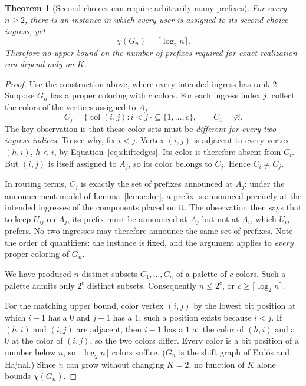 \documentclass[10pt,a4paper]{article}
\newtheorem{theorem}{Theorem}
\newcommand{\col}{\operatorname{col}}
\begin{document}
\begin{theorem}[Second choices can require arbitrarily many prefixes]\label{thm:shift}
For every $n\ge2$, there is an instance in which every user is assigned to its second-choice ingress, yet
\[
\chi(G_n)=\lceil\log_2 n\rceil.
\]
Therefore no upper bound on the number of prefixes required for exact realization can depend only on $K$.
\end{theorem}
\begin{proof}
Use the construction above, where every intended ingress has rank $2$. Suppose $G_n$ has a proper coloring with $c$ colors. For each ingress index $j$, collect the colors of the vertices assigned to $A_j$:
\[
C_j=\{\col(i,j):i<j\}\subseteq\{1,\ldots,c\},
\qquad C_1=\varnothing.
\]
The key observation is that these color sets must be \emph{different for every two ingress indices}. To see why, fix $i<j$. Vertex $(i,j)$ is adjacent to every vertex $(h,i)$, $h<i$, by Equation~\eqref{eq:shiftedges}. Its color is therefore absent from $C_i$. But $(i,j)$ is itself assigned to $A_j$, so its color belongs to $C_j$. Hence $C_i\ne C_j$.

In routing terms, $C_j$ is exactly the set of prefixes announced at $A_j$: under the announcement model of Lemma~\ref{lem:color}, a prefix is announced precisely at the intended ingresses of the components placed on it. The observation then says that to keep $U_{ij}$ on $A_j$, its prefix must be announced at $A_j$ but not at $A_i$, which $U_{ij}$ prefers. No two ingresses may therefore announce the same set of prefixes. Note the order of quantifiers: the instance is fixed, and the argument applies to \emph{every} proper coloring of $G_n$.

We have produced $n$ distinct subsets $C_1,\ldots,C_n$ of a palette of $c$ colors. Such a palette admits only $2^c$ distinct subsets. Consequently $n\le 2^c$, or $c\ge\lceil\log_2n\rceil$.

For the matching upper bound, color vertex $(i,j)$ by the lowest bit position at which $i-1$ has a $0$ and $j-1$ has a $1$; such a position exists because $i<j$. If $(h,i)$ and $(i,j)$ are adjacent, then $i-1$ has a $1$ at the color of $(h,i)$ and a $0$ at the color of $(i,j)$, so the two colors differ. Every color is a bit position of a number below $n$, so $\lceil\log_2 n\rceil$ colors suffice. ($G_n$ is the shift graph of Erd\H{o}s and Hajnal.) Since $n$ can grow without changing $K=2$, no function of $K$ alone bounds $\chi(G_n)$.
\end{proof}
\end{document}
